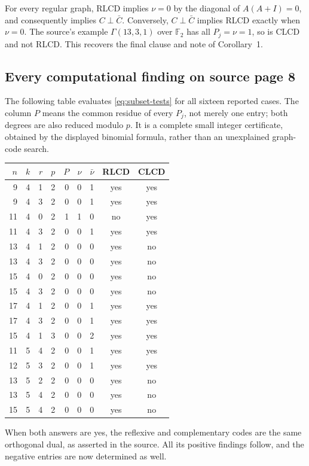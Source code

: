 For every regular graph, RLCD implies $\nu=0$ by the diagonal of
$A(A+I)=0$, and consequently implies $C\perp\bar C$. Conversely,
$C\perp\bar C$ implies RLCD exactly when $\nu=0$. The source's example
$\Gamma(13,3,1)$ over $\mathbb F_2$ has all $P_j=\nu=1$, so is CLCD
and not RLCD. This recovers the final clause and note of Corollary~1.

\subsection{Every computational finding on source page 8}
The following table evaluates \eqref{eq:subset-tests} for all sixteen
reported cases. The column $P$ means the common residue of every
$P_j$, not merely one entry; both degrees are also reduced modulo $p$.
It is a complete small integer certificate, obtained by the displayed
binomial formula, rather than an unexplained graph-code search.
\begin{center}\small
\begin{tabular}{rrrrrrrcc}\toprule
$n$&$k$&$r$&$p$&$P$&$\nu$&$\bar\nu$&RLCD&CLCD\\\midrule
9&4&1&2&0&0&1&yes&yes\\
9&4&3&2&0&0&1&yes&yes\\
11&4&0&2&1&1&0&no&yes\\
11&4&3&2&0&0&1&yes&yes\\
13&4&1&2&0&0&0&yes&no\\
13&4&3&2&0&0&0&yes&no\\
15&4&0&2&0&0&0&yes&no\\
15&4&3&2&0&0&0&yes&no\\
17&4&1&2&0&0&1&yes&yes\\
17&4&3&2&0&0&1&yes&yes\\
15&4&1&3&0&0&2&yes&yes\\
11&5&4&2&0&0&1&yes&yes\\
12&5&3&2&0&0&1&yes&yes\\
13&5&2&2&0&0&0&yes&no\\
13&5&4&2&0&0&0&yes&no\\
15&5&4&2&0&0&0&yes&no\\\bottomrule
\end{tabular}
\end{center}
When both answers are yes, the reflexive and complementary codes are
the same orthogonal dual, as asserted in the source. All its positive
findings follow, and the negative entries are now determined as well.

